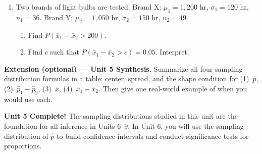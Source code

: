 \documentclass[10pt]{article}
\begin{document}
\begin{enumerate}
  \item Two brands of light bulbs are tested. Brand X: $\mu_1 = 1{,}200$ hr, $\sigma_1 = 120$ hr, $n_1 = 36$.
        Brand Y: $\mu_2 = 1{,}050$ hr, $\sigma_2 = 150$ hr, $n_2 = 49$.
        \begin{enumerate}[label=\alph*.]
          \item Find $P(\bar{x}_1 - \bar{x}_2 > 200)$.\gradedbelow[r]{0.9in-0.33in}{\gradedblank[id=hw2a, type=short, points=2, answer=0.0440, check=numeric, tolerance=0.003]{0.9in}{0.28in}}
                \vspace{0.9in}
          \boxguard[17]
          \item Find $c$ such that $P(\bar{x}_1 - \bar{x}_2 > c) = 0.05$. Interpret.
                \vspace{0.9in}\par
        \end{enumerate}

\end{enumerate}

\begin{extensionbox}
\textbf{Extension (optional) --- Unit 5 Synthesis.}
Summarize all four sampling distribution formulas in a table:
center, spread, and the shape condition for (1)~$\hat{p}$, (2)~$\hat{p}_1-\hat{p}_2$,
(3)~$\bar{x}$, (4)~$\bar{x}_1-\bar{x}_2$. Then give one real-world example of when you
would use each.
\end{extensionbox}

\begin{reflectionbox}
\textbf{Unit 5 Complete!} The sampling distributions studied in this unit are the foundation
for all inference in Units 6--9. In Unit 6, you will use the sampling distribution of $\hat{p}$
to build confidence intervals and conduct significance tests for proportions.
\end{reflectionbox}
\end{document}
